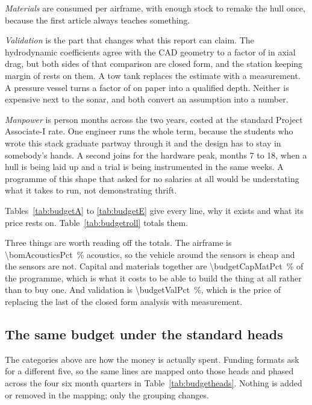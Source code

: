 \documentclass[10pt,a4paper]{article}
\begin{document}
\emph{Materials} are consumed per airframe, with enough stock to remake the
hull once, because the first article always teaches something.

\emph{Validation} is the part that changes what this report can claim. The
hydrodynamic coefficients agree with the CAD geometry to a factor of
\hydroDragRatio{} in axial drag, but both sides of that comparison are
closed form, and the station keeping margin of \hydroMargin{} rests on
them. A tow tank replaces the estimate with a measurement. A pressure vessel
turns a factor of \structFrameGain{} on paper into a qualified depth. Neither
is expensive next to the sonar, and both convert an assumption into a number.

\emph{Manpower} is \budgetManpowerMonths{} person months across the two years,
costed at the standard Project Associate-I rate. One engineer runs the whole
term, because the students who wrote this stack graduate partway through it
and the design has to stay in somebody's hands. A second joins for the
hardware peak, months 7 to 18, when a hull is being laid up and a trial is
being instrumented in the same weeks. A programme of this shape that asked
for no salaries at all would be understating what it takes to run, not
demonstrating thrift.

Tables~\ref{tab:budgetA} to \ref{tab:budgetE} give every line, why it exists
and what its price rests on. Table~\ref{tab:budgetroll} totals them.



Three things are worth reading off the totals. The airframe is
\SI{\bomAcousticsPct}{\percent} acoustics, so the vehicle around the sensors
is cheap and the sensors are not. Capital and materials together are
\SI{\budgetCapMatPct}{\percent} of the programme, which is what it costs to be
able to build the thing at all rather than to buy one. And validation is
\SI{\budgetValPct}{\percent}, which is the price of replacing the last of the
closed form analysis with measurement.

\subsection{The same budget under the standard heads}

The categories above are how the money is actually spent. Funding formats ask
for a different five, so the same lines are mapped onto those heads and phased
across the four six month quarters in Table~\ref{tab:budgetheads}. Nothing is
added or removed in the mapping; only the grouping changes.
\end{document}
